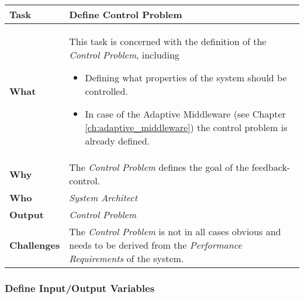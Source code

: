 \begin{tabularx}{\textwidth}{@{} l X @{}}
	\caption{Define Control Problem} \label{table:ch6_Task_Define_Control_Problem}\\
	\toprule 
	\bfseries Task & Define Control Problem\\
	\midrule 
	\bfseries What & 
	This task is concerned with the definition of the \emph{Control Problem}, including
	\begin{itemize}
		\item Defining what properties of the system should be controlled.
		\item In case of the Adaptive Middleware (see Chapter \ref{ch:adaptive_middleware}) the control problem is already defined.
	\end{itemize}
	\\
	\midrule 
	\bfseries Why & The \emph{Control Problem} defines the goal of the feedback-control.\\
	\midrule 
	\bfseries Who & \emph{System Architect}\\
	\midrule 
	\bfseries Output & \emph{Control Problem}\\
	\midrule 
	\bfseries Challenges & The \emph{Control Problem} is not in all cases obvious and needs to be derived from the \emph{Performance Requirements} of the system.\\
	\bottomrule 
\end{tabularx}


\subsubsection{Define Input/Output Variables}

